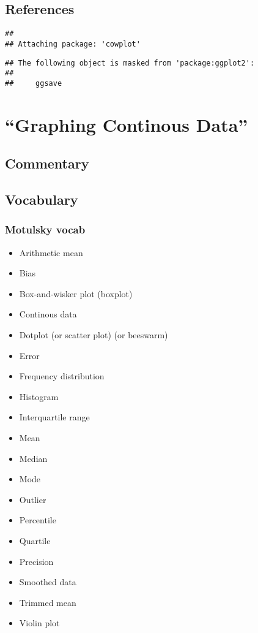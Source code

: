 \documentclass[]{book}
\providecommand{\tightlist}{%
  \setlength{\itemsep}{0pt}\setlength{\parskip}{0pt}}
\theoremstyle{definition}
\theoremstyle{definition}
\theoremstyle{definition}
\theoremstyle{remark}
\begin{document}
\section*{References}\label{references-4}

\begin{verbatim}
## 
## Attaching package: 'cowplot'
\end{verbatim}

\begin{verbatim}
## The following object is masked from 'package:ggplot2':
## 
##     ggsave
\end{verbatim}

\chapter{\texorpdfstring{``Graphing Continous
Data''}{Graphing Continous Data}}\label{graphing-continous-data}

\section*{Commentary}\label{commentary-5}

\section*{Vocabulary}\label{vocabulary-6}

\subsection*{Motulsky vocab}\label{motulsky-vocab-6}

\begin{itemize}
\tightlist
\item
  Arithmetic mean
\item
  Bias
\item
  Box-and-wisker plot (boxplot)
\item
  Continous data
\item
  Dotplot (or scatter plot) (or beeswarm)
\item
  Error
\item
  Frequency distribution
\item
  Histogram
\item
  Interquartile range
\item
  Mean
\item
  Median
\item
  Mode
\item
  Outlier
\item
  Percentile
\item
  Quartile
\item
  Precision
\item
  Smoothed data
\item
  Trimmed mean
\item
  Violin plot
\end{itemize}
\end{document}
